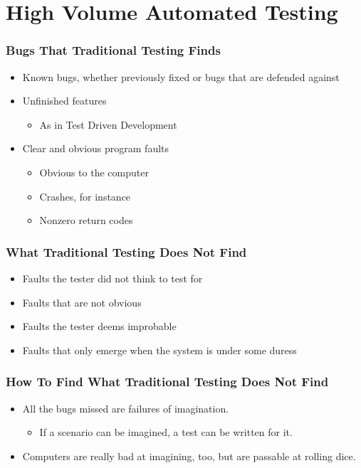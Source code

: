 \section{High Volume Automated Testing}

\begin{frame}
  \frametitle{Bugs That Traditional Testing Finds}
  \begin{itemize}
    \item Known bugs, whether previously fixed or bugs that are defended against
    \item Unfinished features
    \begin{itemize}
      \item As in Test Driven Development
    \end{itemize}
    \item Clear and obvious program faults
    \begin{itemize}
      \item Obvious to the computer
      \item Crashes, for instance
      \item Nonzero return codes
    \end{itemize}
  \end{itemize}
\end{frame}

\begin{frame}
  \frametitle{What Traditional Testing Does Not Find}
  \begin{itemize}
    \item Faults the tester did not think to test for
    \item Faults that are not obvious
    \item Faults the tester deems improbable
    \item Faults that only emerge when the system is under some duress
  \end{itemize}
\end{frame}

\begin{frame}
  \frametitle{How To Find What Traditional Testing Does Not Find}
  \begin{itemize}
    \item All the bugs missed are failures of imagination.
    \begin{itemize}
      \item If a scenario can be imagined, a test can be written for it.
    \end{itemize}
    \item Computers are really bad at imagining, too, but are passable at rolling dice.
  \end{itemize}
\end{frame}

